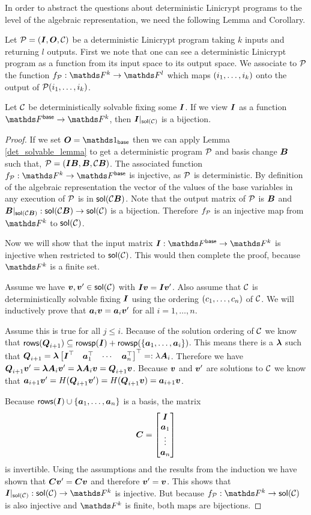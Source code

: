 In order to abstract the questions about deterministic Linicrypt programs to the level of the algebraic representation,
we need the following Lemma and Corollary.

Let $\P = (\I, \O, \C)$ be a deterministic Linicrypt program taking $k$ inputs and returning $l$ outputs.
First we note that one can see a deterministic Linicrypt program as a function from its input space to its output space.
We associate to $\P$ the function $f_\P: \F^k \to \F^l$ which maps $(\dts i k)$ onto the output of $\P(\dts i k)$.

\begin{lemma}
\label{solution_space_bijection}
    Let $\C$ be deterministically solvable fixing some $\I$.
    If we view $\I$ as a function $\Fsp \to \F^k$,
    then $\I|_{\sol(\C)}$ is a bijection.
\end{lemma}

\begin{proof}
    If we set $\O = \Id_\base$
    then we can apply Lemma \ref{det_solvable_lemma} to get a deterministic program $\P$ and basis change $\B$ such that,
    $\P = (\I\B, \B, \C\B)$. 
    The associated function $f_{\P}: \F^k \to \F^\base$ is injective,
    as $\P$ is deterministic.
    By definition of the algebraic representation 
    the vector of the values of the base variables in any execution of $\P$ is in $\sol(\C\B)$.
    Note that the output matrix of $\P$ is $\B$ 
    and $\B|_{\sol(\C\B)}: \sol(\C\B) \to \sol(\C)$ is a bijection.
    Therefore $f_\P$ is an injective map from $\F^k$ to $\sol(\C)$.

    Now we will show that the input matrix $\I: \Fsp \to \F^k$ is injective
    when restricted to $\sol(\C)$.
    This would then complete the proof, because $\F^k$ is a finite set.
    
    Assume we have $\vv, \vv' \in \sol(\C)$ with $\I\vv = \I\vv'$.
    Also assume that $\C$ is deterministically solvable fixing $\I$
    using the ordering $(\dts c n)$ of $\C$.
    We will inductively prove that $\va_i \vv = \va_i \vv'$ for all $i = 1, \dots, n$.

    Assume this is true for all $ j \leq i$.
    Because of the solution ordering of $\C$ we know that
    $\rows(\Q_{i+1}) \subseteq \rowsp(\I) + \rowsp(\{\dts \va {i}\})$. 
    This means there is a $\v \lambda$ such that $\Q_{i+1} = \v \lambda \m{\I^\top & \va_1^\top & \cdots & \va_n^\top}^\top =: \lambda \v A_i$.
    Therefore we have $\Q_{i+1} \vv' = \vl \v A_i \vv' = \vl \v A_i \vv = \Q_{i+1} \vv$.
    Because $\vv$ and $\vv'$ are solutions to $\C$ we know that
    $\va_{i+1}\vv' = \H(\Q_{i+1}\vv') = \H(\Q_{i+1}\vv) = \va_{i+1}\vv$.

    Because $\rows(\I) \cup \{\va_1, \dots, \va_n\}$ is a basis, 
    the matrix 
    \[
    \v C = \m{\I \\ \vdts \va n}
    \]
    is invertible.
    Using the assumptions and the results from the induction we have shown that $\v C \vv' = \v C \vv$ and
    therefore $\vv' = \vv$.
    This shows that $\I|_{\sol(\C)}: \sol(\C) \to \F^k$ is injective.
    But because $f_\P: \F^k \to \sol(\C)$ is also injective
    and $\F^k$ is finite,
    both maps are bijections.
\end{proof}

